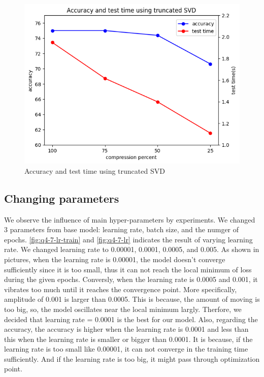 \begin{figure}[htbp]
	\centering
	\includegraphics[width=0.5\linewidth]{image/q4-6-svd.png}
	\caption{Accuracy and test time using truncated SVD}
	\label{fig:cnn_svd}
\end{figure}

\subsection{Changing parameters}
We observe the influence of main hyper-parameters by experiments. We changed 3 parameters from base model: learning rate, batch size, and the numger of epochs.
\cref{fig:q4-7-lr-train} and \cref{fig:q4-7-lr} indicates the result of varying learning rate. We changed learning rate to 0.00001, 0.0001, 0.0005, and 0.005. As shown in pictures, when the learning rate is 0.00001, the model doesn't converge sufficiently since it is too small, thus it can not reach the local minimum of loss during the given epochs.
Conversly, when the learning rate is 0.0005 and 0.001, it vibrates too much until it reaches the convergence point. More specifically, amplitude of 0.001 is larger than 0.0005. This is because, the amount of moving is too big, so, the model oscillates near the local minimum largly.
Therfore, we decided that learning rate = 0.0001 is the best for our model.
Also, regarding the accuracy, the accuracy is higher when the learning rate is 0.0001 and less than this when the learning rate is smaller or bigger than 0.0001. It is because, if the learning rate is too small like 0.00001, it can not converge in the training time sufficiently. And if the learning rate is too big, it might pass through optimization point.

